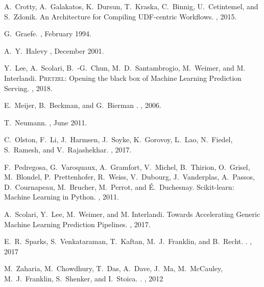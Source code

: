 \documentclass[11pt]{article}
\newcommand{\pretzel}{\textsc{Pretzel}\xspace}
\begin{document}
\begin{small}
\begin{thebibliography}{10}
A.~Crotty, A.~Galakatos, K.~Dursun, T.~Kraska, C.~Binnig, U.~Cetintemel, and S.~Zdonik.
\newblock An Architecture for Compiling {UDF}-centric Workflows.
, 2015.

G.~Graefe.
, {February 1994}.

{A.~Y.~Halevy}
, December 2001.

Y.~Lee, A.~Scolari, B.~-G.~Chun, M.~D.~Santambrogio, M.~Weimer, and M. Interlandi.
\newblock \pretzel: Opening the black box of Machine Learning Prediction Serving.
, 2018.

{E.~Meijer, B.~Beckman, and G.~Bierman}
.
, 2006.

T.~Neumann.
, June 2011.

C.~Olston, F.~Li, J.~Harmsen, J.~Soyke, K.~Gorovoy, L.~Lao, N.~Fiedel, S.~Ramesh, and V.~Rajashekhar.
, 2017.

F.~Pedregosa, G.~Varoquaux, A.~Gramfort, V.~Michel, B.~Thirion, O.~Grisel, M.~Blondel, P.~Prettenhofer, R.~Weiss, V.~Dubourg, J.~Vanderplas, A.~Passos, D.~Cournapeau, M.~Brucher, M.~Perrot, and \'{E}.~Duchesnay.
\newblock Scikit-learn: Machine Learning in Python.
, 2011.

A.~Scolari, Y.~Lee, M.~Weimer, and M. Interlandi.
\newblock Towards Accelerating Generic Machine Learning Prediction Pipelines.
, 2017.

{E.~R.~Sparks, S.~Venkataraman, T.~Kaftan, M.~J.~Franklin, and B.~Recht}.
.
, 2017

M.~Zaharia, M.~Chowdhury, T.~Das, A.~Dave, J.~Ma, M.~McCauley, M.~J.~Franklin, S.~Shenker, and I.~Stoica.
.
, 2012


\end{thebibliography}
\end{small}
\end{document}

